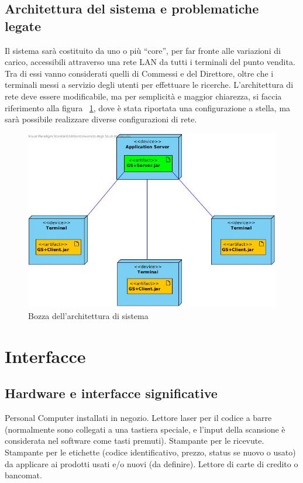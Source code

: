 \documentclass[a4paper,10pt]{report}
\begin{document}
 \subsection*{Architettura del sistema e problematiche legate}
Il sistema sarà costituito da uno o più “core”, per far fronte alle variazioni di carico, accessibili attraverso una rete LAN da tutti i terminali del punto vendita. Tra di essi vanno considerati quelli di Commessi e del Direttore, oltre che i terminali messi a servizio degli utenti per effettuare le ricerche.
L’architettura di rete deve essere modificabile, ma per semplicità e maggior chiarezza, si faccia riferimento alla figura ~\ref{fig:deploy}, dove è stata riportata una configurazione a stella, ma sarà possibile realizzare diverse configurazioni di rete.
\begin{figure}[!ht]
\centering
\includegraphics[width=\textwidth]{Deployment Diagram1.jpg}
\caption{Bozza dell'architettura di sistema}
\label{fig:deploy}
\end{figure}



 \section*{Interfacce}
 \subsection*{Hardware e interfacce significative}
Personal Computer installati in negozio.
Lettore laser per il codice a barre (normalmente sono collegati a una tastiera speciale, e l’input della scansione è considerata nel software come tasti premuti).
Stampante per le ricevute.
Stampante per le etichette (codice identificativo, prezzo, status se nuovo o usato) da applicare ai prodotti usati e/o nuovi (da definire).
Lettore di carte di credito o bancomat.
\end{document}
